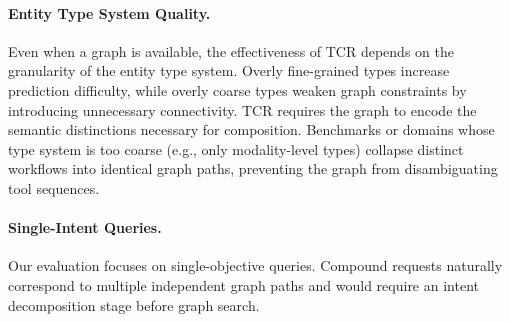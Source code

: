\paragraph{Entity Type System Quality.}

Even when a graph is available, the effectiveness of TCR depends on the granularity of the entity type system.
Overly fine-grained types increase prediction difficulty, while overly coarse types weaken graph constraints by introducing unnecessary connectivity.
TCR requires the graph to encode the semantic distinctions necessary for composition.
Benchmarks or domains whose type system is too coarse (e.g., only modality-level types) collapse distinct workflows into identical graph paths, preventing the graph from disambiguating tool sequences.

\paragraph{Single-Intent Queries.}

Our evaluation focuses on single-objective queries.
Compound requests naturally correspond to multiple independent graph paths and would require an intent decomposition stage before graph search.
